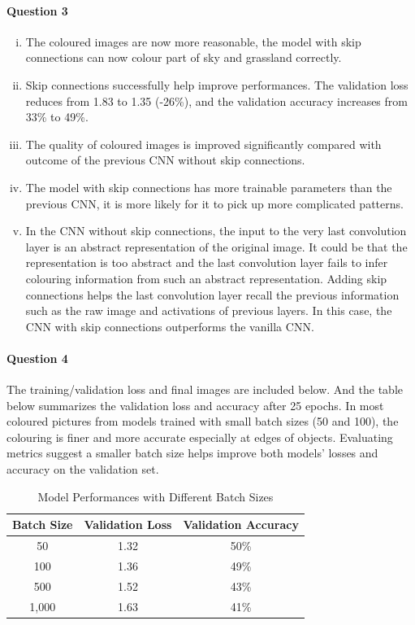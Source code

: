 \documentclass[12pt]{article}
\begin{document}
	\paragraph{Question 3}
	\begin{enumerate}[(i)]
		\item The coloured images are now more reasonable, the model with skip connections can now colour part of sky and grassland correctly.
		\item Skip connections successfully help improve performances. The validation loss reduces from 1.83 to 1.35 (-26\%), and the validation accuracy increases from 33\% to 49\%.
		\item The quality of coloured images is improved significantly compared with outcome of the previous CNN without skip connections.
		\item The model with skip connections has more trainable parameters than the previous CNN, it is more likely for it to pick up more complicated patterns.
		\item In the CNN without skip connections, the input to the very last convolution layer is an abstract representation of the original image. It could be that the representation is too abstract and the last convolution layer fails to infer colouring information from such an abstract representation. Adding skip connections helps the last convolution layer recall the previous information such as the raw image and activations of previous layers. In this case, the CNN with skip connections outperforms the vanilla CNN.
	\end{enumerate}
	\paragraph{Question 4} The training/validation loss and final images are included below. And the table below summarizes the validation loss and accuracy after 25 epochs. In most coloured pictures from models trained with small batch sizes (50 and 100), the colouring is finer and more accurate especially at edges of objects. Evaluating metrics suggest a smaller batch size helps improve both models' losses and accuracy on the validation set.
	
	\begin{table}[H]
		\centering
		\caption{Model Performances with Different Batch Sizes}
		\begin{tabular}{c|c c}
			\toprule
			Batch Size & Validation Loss & Validation Accuracy \\
			\midrule
			50 & 1.32 & 50\% \\
			100 & 1.36 & 49\% \\
			500 & 1.52 & 43\% \\
			1,000 & 1.63 & 41\% \\
			\bottomrule
		\end{tabular}
	\end{table}
	
\end{document}
